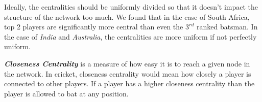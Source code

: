 \documentclass{article}
\begin{document}
Ideally, the centralities should be uniformly divided so that it doesn't impact the structure of the network too much. We found that in the case of South Africa, top 2 players are significantly more central than even the $3^{rd}$ ranked batsman. In the case of \textit{India} and \textit{Australia}, the centralities are more uniform if not perfectly uniform.

\begin{table}[!h]
\end{table}

\textbf{\textit{Closeness Centrality}} is a measure of how easy it is to reach a given node in the network. In cricket, closeness centrality would mean how closely a player is connected to other players. If a player has a higher closeness centrality than the player is allowed to bat at any position. 
\end{document}
